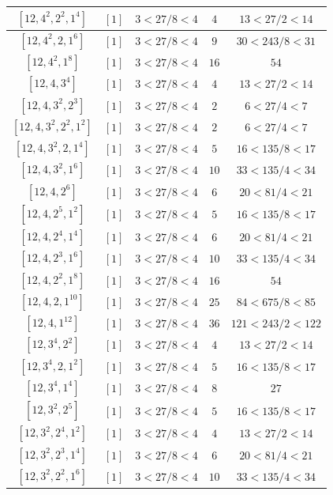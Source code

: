 \documentclass{article}%
\begin{document}
\begin{center}
\begin{longtable}{||c|c|c|c|c||}
$[12, 4^{2}, 2^{2}, 1^{4}]$ & $[1]$ & $3 < 27/8 < 4$ & $4$ & $13 < 27/2 < 14$ \\ \hline 
$[12, 4^{2}, 2, 1^{6}]$ & $[1]$ & $3 < 27/8 < 4$ & $9$ & $30 < 243/8 < 31$ \\ \hline 
$[12, 4^{2}, 1^{8}]$ & $[1]$ & $3 < 27/8 < 4$ & $16$ & $54$ \\ \hline 
$[12, 4, 3^{4}]$ & $[1]$ & $3 < 27/8 < 4$ & $4$ & $13 < 27/2 < 14$ \\ \hline 
$[12, 4, 3^{2}, 2^{3}]$ & $[1]$ & $3 < 27/8 < 4$ & $2$ & $6 < 27/4 < 7$ \\ \hline 
$[12, 4, 3^{2}, 2^{2}, 1^{2}]$ & $[1]$ & $3 < 27/8 < 4$ & $2$ & $6 < 27/4 < 7$ \\ \hline 
$[12, 4, 3^{2}, 2, 1^{4}]$ & $[1]$ & $3 < 27/8 < 4$ & $5$ & $16 < 135/8 < 17$ \\ \hline 
$[12, 4, 3^{2}, 1^{6}]$ & $[1]$ & $3 < 27/8 < 4$ & $10$ & $33 < 135/4 < 34$ \\ \hline 
$[12, 4, 2^{6}]$ & $[1]$ & $3 < 27/8 < 4$ & $6$ & $20 < 81/4 < 21$ \\ \hline 
$[12, 4, 2^{5}, 1^{2}]$ & $[1]$ & $3 < 27/8 < 4$ & $5$ & $16 < 135/8 < 17$ \\ \hline 
$[12, 4, 2^{4}, 1^{4}]$ & $[1]$ & $3 < 27/8 < 4$ & $6$ & $20 < 81/4 < 21$ \\ \hline 
$[12, 4, 2^{3}, 1^{6}]$ & $[1]$ & $3 < 27/8 < 4$ & $10$ & $33 < 135/4 < 34$ \\ \hline 
$[12, 4, 2^{2}, 1^{8}]$ & $[1]$ & $3 < 27/8 < 4$ & $16$ & $54$ \\ \hline 
$[12, 4, 2, 1^{10}]$ & $[1]$ & $3 < 27/8 < 4$ & $25$ & $84 < 675/8 < 85$ \\ \hline 
$[12, 4, 1^{12}]$ & $[1]$ & $3 < 27/8 < 4$ & $36$ & $121 < 243/2 < 122$ \\ \hline 
$[12, 3^{4}, 2^{2}]$ & $[1]$ & $3 < 27/8 < 4$ & $4$ & $13 < 27/2 < 14$ \\ \hline 
$[12, 3^{4}, 2, 1^{2}]$ & $[1]$ & $3 < 27/8 < 4$ & $5$ & $16 < 135/8 < 17$ \\ \hline 
$[12, 3^{4}, 1^{4}]$ & $[1]$ & $3 < 27/8 < 4$ & $8$ & $27$ \\ \hline 
$[12, 3^{2}, 2^{5}]$ & $[1]$ & $3 < 27/8 < 4$ & $5$ & $16 < 135/8 < 17$ \\ \hline 
$[12, 3^{2}, 2^{4}, 1^{2}]$ & $[1]$ & $3 < 27/8 < 4$ & $4$ & $13 < 27/2 < 14$ \\ \hline 
$[12, 3^{2}, 2^{3}, 1^{4}]$ & $[1]$ & $3 < 27/8 < 4$ & $6$ & $20 < 81/4 < 21$ \\ \hline 
$[12, 3^{2}, 2^{2}, 1^{6}]$ & $[1]$ & $3 < 27/8 < 4$ & $10$ & $33 < 135/4 < 34$ \\ \hline 

\end{longtable}
\end{center}
\end{document}

